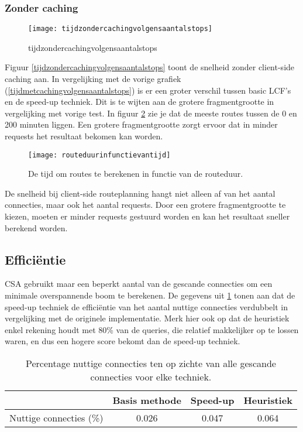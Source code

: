\subsubsection{Zonder caching} 

\begin{figure}[h!]
\centering
\texttt{[image: tijdzondercachingvolgensaantalstops]}
\caption{tijdzondercachingvolgensaantalstops}
\label{tijd zonder caching volgens aantal stops}
\end{figure}

Figuur \ref{tijdzondercachingvolgensaantalstops} toont de snelheid zonder client-side caching aan. In vergelijking met de vorige grafiek (\ref{tijdmetcachingvolgensaantalstops}) is er een groter verschil tussen basic LCF's en de speed-up techniek. Dit is te wijten aan de grotere fragmentgrootte in vergelijking met vorige test. In figuur \ref{routeduurinfunctievantijd} zie je dat de meeste routes tussen de 0 en 200 minuten liggen. Een grotere fragmentgrootte zorgt ervoor dat in minder requests het resultaat bekomen kan worden.

\begin{figure}[h!]
\centering
\texttt{[image: routeduurinfunctievantijd]}
\caption{De tijd om routes te berekenen in functie van de routeduur.}
\label{routeduurinfunctievantijd}
\end{figure}

De snelheid bij client-side routeplanning hangt niet alleen af van het aantal connecties, maar ook het aantal requests. Door een grotere fragmentgrootte te kiezen, moeten er minder requests gestuurd worden en kan het resultaat sneller berekend worden.

\subsection{Effici\"entie}
CSA gebruikt maar een beperkt aantal van de gescande connecties om een minimale overspannende boom te berekenen. De gegevens uit \ref{table:efficientie} tonen aan dat de speed-up techniek de effici\"entie van het aantal nuttige connecties verdubbelt in vergelijking met de originele implementatie. Merk hier ook op dat de heuristiek enkel rekening houdt met 80\% van de queries, die relatief makkelijker op te lossen waren, en dus een hogere score bekomt dan de speed-up techniek. 

\begin{table}[htbp]
\centering
\begin{tabular}{ | c || c | c | c | }
 &  Basis methode & Speed-up & Heuristiek \\ \hline
  Nuttige connecties (\%) & 0.026 & 0.047 & 0.064 \\
\hline
\end{tabular}
\caption{Percentage nuttige connecties ten op zichte van alle gescande connecties voor elke techniek.}
\label{table:efficientie}
\end{table}

